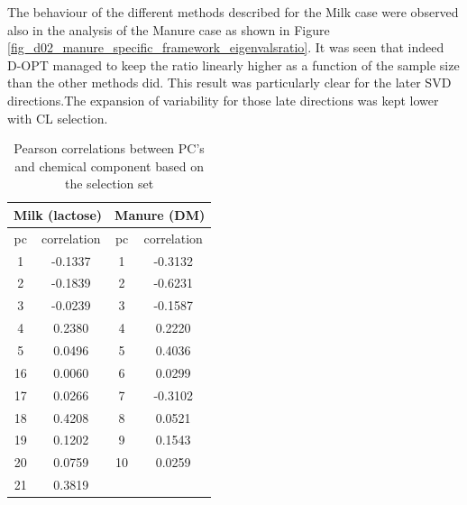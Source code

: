 \documentclass[journal=ancham,manuscript=article]{achemso}
\begin{document}
The behaviour of the different methods described for the Milk case were observed also in the analysis of the Manure case as shown in Figure \ref{fig_d02_manure_specific_framework_eigenvalsratio}. It was seen that indeed D-OPT managed to keep the ratio linearly higher as a function of the sample size than the other methods did. This result was particularly clear for the later SVD directions.The expansion of variability for those late directions was kept lower with CL selection.  

\begin{table}[t]
\centering
\begin{tabular}{|cc|cc|} 
\hline
\multicolumn{2}{|c|}{Milk (lactose)} & \multicolumn{2}{|c|}{Manure (DM)}\\
\hline
pc	& correlation	&  pc & correlation	\\
\hline
  1 & -0.1337 & 1 & -0.3132 \\
  2 & -0.1839 & 2 & -0.6231 \\
  3 & -0.0239 & 3 & -0.1587 \\
  4 &  0.2380 & 4 &  0.2220 \\
  5 &  0.0496 & 5 &  0.4036 \\
 16 &  0.0060 & 6 &  0.0299 \\
 17 &  0.0266 & 7 & -0.3102 \\
 18 &  0.4208 & 8 & 0.0521 \\
 19 &  0.1202 & 9 & 0.1543 \\
 20 &  0.0759 & 10& 0.0259 \\
 21 &  0.3819 &  & \\
 \hline
\end{tabular}
\caption{Pearson correlations between PC's and chemical component based on the selection set}
\label{tab_correlations}
\end{table}


\begin{figure}[t]
    \centering
    \caption{}
    \label{fig_specific_framework_detereigevect}
\end{figure}
\end{document}

